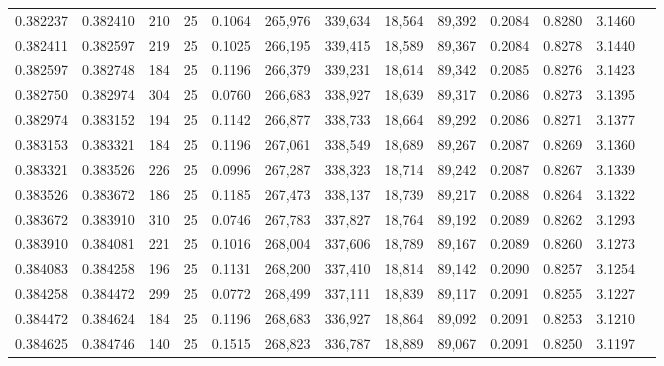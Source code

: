 \begin{tabular}{rrrrrrrrrrrrr}
0.382237 & 0.382410 &   210 &  25 &                                     0.1064 & 265,976 & 339,634 &  18,564 &  89,392 & 0.2084 & 0.8280 & 3.1460 \\
0.382411 & 0.382597 &   219 &  25 &                                     0.1025 & 266,195 & 339,415 &  18,589 &  89,367 & 0.2084 & 0.8278 & 3.1440 \\
0.382597 & 0.382748 &   184 &  25 &                                     0.1196 & 266,379 & 339,231 &  18,614 &  89,342 & 0.2085 & 0.8276 & 3.1423 \\
0.382750 & 0.382974 &   304 &  25 &                                     0.0760 & 266,683 & 338,927 &  18,639 &  89,317 & 0.2086 & 0.8273 & 3.1395 \\
0.382974 & 0.383152 &   194 &  25 &                                     0.1142 & 266,877 & 338,733 &  18,664 &  89,292 & 0.2086 & 0.8271 & 3.1377 \\
0.383153 & 0.383321 &   184 &  25 &                                     0.1196 & 267,061 & 338,549 &  18,689 &  89,267 & 0.2087 & 0.8269 & 3.1360 \\
0.383321 & 0.383526 &   226 &  25 &                                     0.0996 & 267,287 & 338,323 &  18,714 &  89,242 & 0.2087 & 0.8267 & 3.1339 \\
0.383526 & 0.383672 &   186 &  25 &                                     0.1185 & 267,473 & 338,137 &  18,739 &  89,217 & 0.2088 & 0.8264 & 3.1322 \\
0.383672 & 0.383910 &   310 &  25 &                                     0.0746 & 267,783 & 337,827 &  18,764 &  89,192 & 0.2089 & 0.8262 & 3.1293 \\
0.383910 & 0.384081 &   221 &  25 &                                     0.1016 & 268,004 & 337,606 &  18,789 &  89,167 & 0.2089 & 0.8260 & 3.1273 \\
0.384083 & 0.384258 &   196 &  25 &                                     0.1131 & 268,200 & 337,410 &  18,814 &  89,142 & 0.2090 & 0.8257 & 3.1254 \\
0.384258 & 0.384472 &   299 &  25 &                                     0.0772 & 268,499 & 337,111 &  18,839 &  89,117 & 0.2091 & 0.8255 & 3.1227 \\
0.384472 & 0.384624 &   184 &  25 &                                     0.1196 & 268,683 & 336,927 &  18,864 &  89,092 & 0.2091 & 0.8253 & 3.1210 \\
0.384625 & 0.384746 &   140 &  25 &                                     0.1515 & 268,823 & 336,787 &  18,889 &  89,067 & 0.2091 & 0.8250 & 3.1197 \\

\end{tabular}
